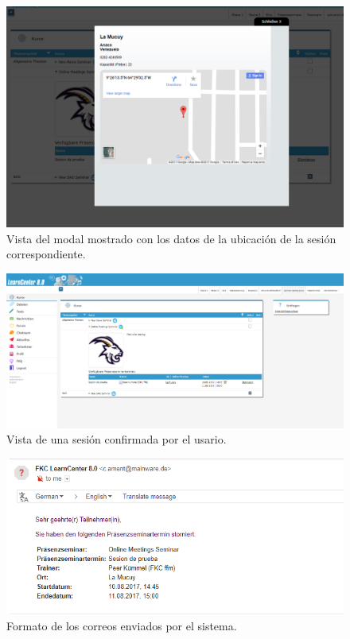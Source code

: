 \begin{figure}[h]
	\begin{center}
		\includegraphics[width=\textwidth]{screenshots/modal_ubicacion.png}
		\caption{Vista del modal mostrado con los datos de la ubicación de la sesión correspondiente.} \label{fig:modalUbicacion}
	\end{center}
\end{figure}

\begin{figure}[h]
	\begin{center}
		\includegraphics[width=\textwidth]{screenshots/user_reservar.png}
		\caption{Vista de una sesión confirmada por el usario.} \label{fig:usuarioSesionConfirmada}
	\end{center}
\end{figure}

\begin{figure}[h]
	\begin{center}
		\includegraphics[width=\textwidth]{screenshots/emails.png}
		\caption{Formato de los correos enviados por el sistema.} \label{fig:correos}
	\end{center}
\end{figure}

